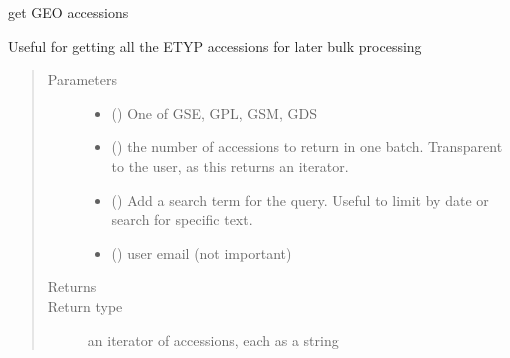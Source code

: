 \documentclass[letterpaper,10pt,english]{sphinxmanual}
\begin{document}
\begin{fulllineitems}
\label{\detokenize{omicidx.geometa:omicidx.geometa.get_geo_accession_xml}}
\end{fulllineitems}


\begin{fulllineitems}
\label{\detokenize{omicidx.geometa:omicidx.geometa.get_geo_accessions}}
get GEO accessions

Useful for getting all the ETYP accessions for
later bulk processing
\begin{quote}\begin{description}
\item[{Parameters}] \leavevmode\begin{itemize}
\item {} 
 () \textendash{} One of GSE, GPL, GSM, GDS

\item {} 
 () \textendash{} the number of accessions to return in one batch.
Transparent to the user, as this returns an iterator.

\item {} 
 () \textendash{} Add a search term for the query. Useful to limit
by date or search for specific text.

\item {} 
 () \textendash{} user email (not important)

\end{itemize}

\item[{Returns}] \leavevmode


\item[{Return type}] \leavevmode
an iterator of accessions, each as a string

\end{description}\end{quote}

\end{fulllineitems}
\end{document}

